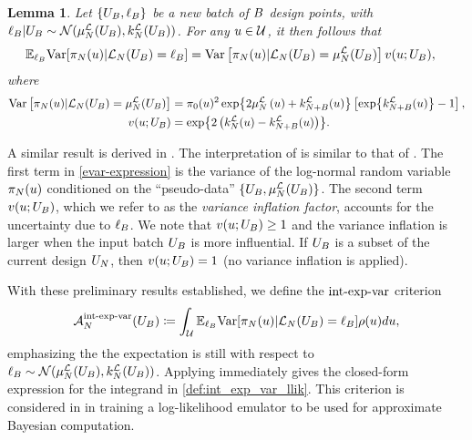 \documentclass[12pt]{article}
\newtheorem{lemma}{Lemma}
\begin{document}
\begin{lemma} \label{lemma:evar}
Let $\{\designBatchIn, \designBatchLlik\}$ be a new batch of $\Nbatch$ design points, with 
$\designBatchLlik | \designBatchIn \sim \Gaussian(\emMean[\Ndesign]{\llik}(\designBatchIn), \emKer[\Ndesign]{\llik}(\designBatchIn))$. 
For any $\Par \in \parSpace$, it then follows that 
\begin{align}
\E_{\designBatchLlik} \Var[\llikEmRdmDens[\Ndesign](\Par) | \llikEm[\Ndesign](\designBatchIn) = \designBatchLlik]
&= \Var\left[\llikEmRdmDens[\Ndesign](\Par) | \llikEm[\Ndesign](\designBatchIn) = \emMean[\Ndesign]{\llik}(\designBatchIn)\right]
	\varInflation(\Par; \designBatchIn), \label{evar-expression}
\end{align}
where 
\begin{align}
\Var\left[\llikEmRdmDens[\Ndesign](\Par) | \llikEm[\Ndesign](\designBatchIn) = \emMean[\Ndesign]{\llik}(\designBatchIn)\right]
&= \priorDens(\Par)^2 \Exp{2\emMean[\Ndesign]{\llik}\left(\Par\right) + \emKer[\Naugment]{\llik}(\Par)} 
\left[\Exp{\emKer[\Naugment]{\llik}(\Par)} - 1 \right], \nonumber \\
\varInflation(\Par; \designBatchIn)
&= \Exp{2\left(\emKer[\Ndesign]{\llik}(\Par) - \emKer[\Naugment]{\llik}(\Par)\right)}. \label{var_inflation_factor}
\end{align}
\end{lemma}

A similar result is derived in \cite{VehtariParallelGP}.
The interpretation of  is similar to that of . 
The first term in \ref{evar-expression} is the variance of the log-normal random variable
 $\llikEmRdmDens[\Ndesign](\Par)$ conditioned on the ``pseudo-data''
 $\{\designBatchIn, \emMean[\Ndesign]{\llik}(\designBatchIn)\}$. The second term 
 $\varInflation(\Par; \designBatchIn)$, which we refer to as the \textit{variance inflation factor}, 
 accounts for the uncertainty due to $\designBatchLlik$. We note that 
$\varInflation(\Par; \designBatchIn) \geq 1$ and the variance inflation is larger when the 
input batch $\designBatchIn$ is more influential. If $\designBatchIn$ is a subset of the 
current design $\designIn[\Ndesign]$, then $\varInflation(\Par; \designBatchIn) = 1$ (no 
variance inflation is applied). 

With these preliminary results established, we define the $\intExpVarLabel$ criterion
\begin{align}
\labelAcq[\Ndesign]{\intExpVarLabel}(\designBatchIn) \Def
\int_{\parSpace} \E_{\designBatchLlik} \Var[\llikEmRdmDens[\Ndesign](\Par) | \llikEm[\Ndesign](\designBatchIn) = \designBatchLlik] \weightDens(\Par) d\Par, \label{def:int_exp_var_llik}
\end{align}
emphasizing the the expectation is still with respect to 
$\designBatchLlik \sim \Gaussian(\emMean[\Ndesign]{\llik}(\designBatchIn), \emKer[\Ndesign]{\llik}(\designBatchIn))$. 
Applying  immediately gives the closed-form expression for the integrand in \ref{def:int_exp_var_llik}. 
This criterion is considered in \cite{VehtariParallelGP} in training a log-likelihood emulator to be used for 
approximate Bayesian computation.
\end{document}
